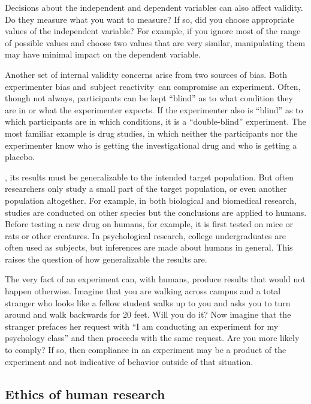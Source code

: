 \begin{refsection}
Decisions about the independent and dependent variables can also affect validity. Do they measure what you want to measure? If so, did you choose appropriate values of the independent variable? For example, if you ignore most of the range of possible values and choose two values that are very similar, manipulating them may have minimal impact on the dependent variable.

Another set of internal validity concerns arise from two sources of bias. Both experimenter bias and subject reactivity can compromise an experiment. Often, though not always, participants can be kept ``blind'' as to what condition they are in or what the experimenter expects. If the experimenter also is ``blind'' as to which participants are in which conditions, it is a ``double-blind'' experiment. The most familiar example is drug studies, in which neither the participants nor the experimenter know who is getting the investigational drug and who is getting a placebo.

, its results must be generalizable to the intended target population. But often researchers only study a small part of the target population, or even another population altogether. For example, in both biological and biomedical research, studies are conducted on other species but the conclusions are applied to humans. Before testing a new drug on humans, for example, it is first tested on mice or rats or other creatures. In psychological research, college undergraduates are often used as subjects, but inferences are made about humans in general. This raises the question of how generalizable the results are.

The very fact of an experiment can, with humans, produce results that would not happen otherwise. Imagine that you are walking across campus and a total stranger who looks like a fellow student walks up to you and asks you to turn around and walk backwards for 20 feet. Will you do it? Now imagine that the stranger prefaces her request with ``I am conducting an experiment for my psychology class'' and then proceeds with the same request. Are you more likely to comply? If so, then compliance in an experiment may be a product of the experiment and not indicative of behavior outside of that situation.

\subsection{Ethics of human research}
\label{ethicsofhumanresearch}


\end{refsection}
